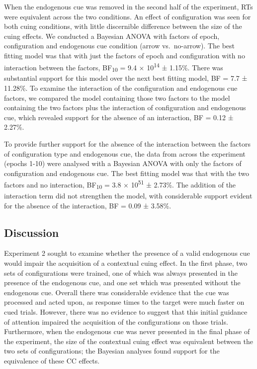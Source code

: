 \documentclass[
  man,floatsintext]{apa7}
\begin{document}
When the endogenous cue was removed in the second half of the experiment, RTs were equivalent across the two conditions. An effect of configuration was seen for both cuing conditions, with little discernible difference between the size of the cuing effects. We conducted a Bayesian ANOVA with factors of epoch, configuration and endogenous cue condition (arrow vs.~no-arrow). The best fitting model was that with just the factors of epoch and configuration with no interaction between the factors, BF\textsubscript{10} = 9.4 × 10\textsuperscript{14} ± 1.15\%. There was substantial support for this model over the next best fitting model, BF = 7.7 ± 11.28\%. To examine the interaction of the configuration and endogenous cue factors, we compared the model containing those two factors to the model containing the two factors plus the interaction of configuration and endogenous cue, which revealed support for the absence of an interaction, BF = 0.12 ± 2.27\%.

To provide further support for the absence of the interaction between the factors of configuration type and endogenous cue, the data from across the experiment (epochs 1-10) were analysed with a Bayesian ANOVA with only the factors of configuration and endogenous cue. The best fitting model was that with the two factors and no interaction, BF\textsubscript{10} = 3.8 × 10\textsuperscript{51} ± 2.73\%. The addition of the interaction term did not strengthen the model, with considerable support evident for the absence of the interaction, BF = 0.09 ± 3.58\%.

\hypertarget{discussion-1}{%
\subsection{Discussion}\label{discussion-1}}

Experiment 2 sought to examine whether the presence of a valid endogenous cue would impair the acquisition of a contextual cuing effect. In the first phase, two sets of configurations were trained, one of which was always presented in the presence of the endogenous cue, and one set which was presented without the endogenous cue. Overall there was considerable evidence that the cue was processed and acted upon, as response times to the target were much faster on cued trials. However, there was no evidence to suggest that this initial guidance of attention impaired the acquisition of the configurations on those trials. Furthermore, when the endogenous cue was never presented in the final phase of the experiment, the size of the contextual cuing effect was equivalent between the two sets of configurations; the Bayesian analyses found support for the equivalence of these CC effects.
\end{document}
